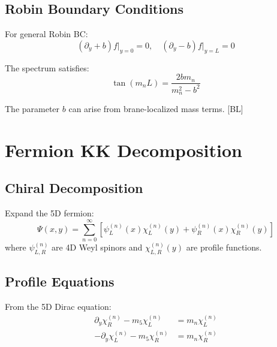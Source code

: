 \documentclass[11pt,a4paper]{article}
\begin{document}
\subsection{Robin Boundary Conditions}

For general Robin BC:
\begin{equation}
(\partial_y + b) f\big|_{y=0} = 0, \quad (\partial_y - b) f\big|_{y=L} = 0
\label{eq:robin-bc}
\end{equation}

The spectrum satisfies:
\begin{equation}
\tan(m_n L) = \frac{2 b m_n}{m_n^2 - b^2}
\label{eq:robin-spectrum}
\end{equation}

The parameter $b$ can arise from brane-localized mass terms. [BL]

\section{Fermion KK Decomposition}
\label{sec:ferm-kk}

\subsection{Chiral Decomposition}

Expand the 5D fermion:
\begin{equation}
\Psi(x,y) = \sum_{n=0}^{\infty} \left[ \psi_L^{(n)}(x) \chi_L^{(n)}(y) + \psi_R^{(n)}(x) \chi_R^{(n)}(y) \right]
\label{eq:ferm-kk}
\end{equation}
where $\psi_{L,R}^{(n)}$ are 4D Weyl spinors and $\chi_{L,R}^{(n)}(y)$ are profile functions.

\subsection{Profile Equations}

From the 5D Dirac equation:
\begin{equation}
\begin{aligned}
\partial_y \chi_R^{(n)} - m_5 \chi_L^{(n)} &= m_n \chi_L^{(n)} \\
-\partial_y \chi_L^{(n)} - m_5 \chi_R^{(n)} &= m_n \chi_R^{(n)}
\end{aligned}
\label{eq:profile-eq}
\end{equation}
\end{document}
